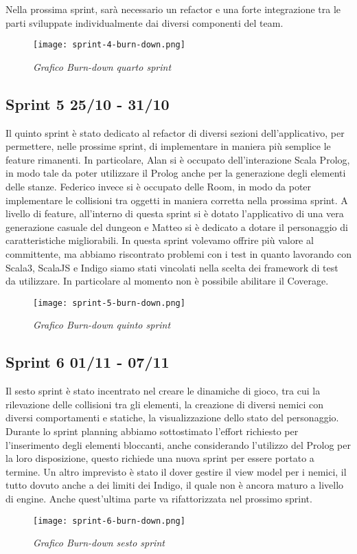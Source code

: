 Nella prossima sprint, sarà necessario un refactor e una forte integrazione tra le parti sviluppate individualmente dai diversi componenti del team.

\begin{figure}[!hbt]
    \centering
    \texttt{[image: sprint-4-burn-down.png]}
    \caption{\textit{Grafico Burn-down quarto sprint}} 
\end{figure}


\subsection{Sprint 5 25/10 - 31/10}
Il quinto sprint è stato dedicato al refactor di diversi sezioni dell'applicativo, per permettere, nelle prossime sprint, di implementare in maniera più semplice le feature rimanenti.  
In particolare, Alan si è occupato dell'interazione Scala Prolog, in modo tale da poter utilizzare il Prolog anche per la generazione degli elementi delle stanze. Federico invece si è occupato delle Room, in modo da poter implementare le collisioni tra oggetti in maniera corretta nella prossima sprint. 
A livello di feature, all'interno di questa sprint si è dotato l'applicativo di una vera generazione casuale del dungeon e Matteo si è dedicato a dotare il personaggio di caratteristiche migliorabili. 
In questa sprint volevamo offrire più valore al committente, ma abbiamo riscontrato problemi con i test in quanto lavorando con Scala3, ScalaJS e Indigo siamo stati vincolati nella scelta dei framework di test da utilizzare. In particolare al momento non è possibile abilitare il Coverage.


\begin{figure}[!hbt]
    \centering
    \texttt{[image: sprint-5-burn-down.png]}
    \caption{\textit{Grafico Burn-down quinto sprint}} 
\end{figure}

\subsection{Sprint 6 01/11 - 07/11}
Il sesto sprint è stato incentrato nel creare le dinamiche di gioco, tra cui la rilevazione delle collisioni tra gli elementi, la creazione di diversi nemici con diversi comportamenti e statiche, la visualizzazione dello stato del personaggio. 
Durante lo sprint planning abbiamo sottostimato l'effort richiesto per l'inserimento degli elementi bloccanti, anche considerando l'utilizzo del Prolog per la loro disposizione, questo richiede una nuova sprint per essere portato a termine. Un altro imprevisto è stato il dover gestire il view model per i nemici, il tutto dovuto anche a dei limiti dei Indigo, il quale non è ancora maturo a livello di engine. Anche quest'ultima parte va rifattorizzata nel prossimo sprint.
\begin{figure}[!hbt]
    \centering
    \texttt{[image: sprint-6-burn-down.png]}
    \caption{\textit{Grafico Burn-down sesto sprint}} 
\end{figure}

